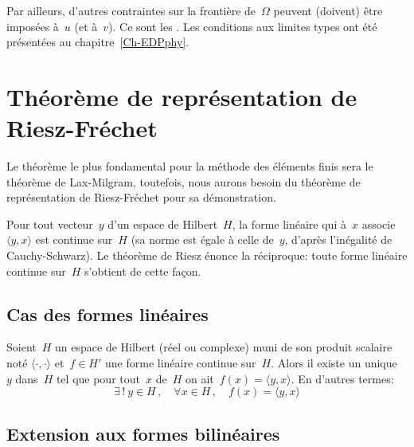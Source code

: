 \medskip
Par ailleurs, d'autres contraintes sur la frontière de~$\Omega$ peuvent (doivent) être imposées à~$u$ (et à~$v$). Ce sont les .
Les conditions aux limites types ont été présentées au chapitre~\ref{Ch-EDPphy}.

\medskip
\section{Théorème de représentation de Riesz-Fréchet}
Le théorème le plus fondamental pour la méthode des éléments finis sera le théorème de Lax-Milgram, toutefois, nous aurons besoin du théorème de représentation de Riesz-Fréchet pour sa démonstration. 

\medskip
Pour tout vecteur~$y$ d'un espace de Hilbert~$H$, la forme linéaire qui à~$x$ associe~$\langle y,x\rangle$ est continue sur~$H$ (sa norme est égale à celle de~$y$, d'après l'inégalité de Cauchy-Schwarz). Le théorème de Riesz énonce la réciproque: toute forme linéaire continue sur~$H$ s'obtient de cette façon.

\medskip
\subsection{Cas des formes linéaires}

\begin{theoreme}\label{Th-RF}
Soient~$H$ un espace de Hilbert (réel ou complexe) muni de son produit scalaire noté $\langle\cdot,\cdot\rangle$ et~$f \in H'$ une forme linéaire continue sur~$H$.
Alors il existe un unique~$y$ dans~$H$ tel que pour tout~$x$ de~$H$ on ait~$f(x)=\langle y,x\rangle$. En d'autres termes:
\begin{equation}
\exists\,!\ y \in H\,, \quad \forall x\in H\,, \quad f(x) = \langle y,x\rangle
\end{equation}
\end{theoreme}

\medskip
\subsection{Extension aux formes bilinéaires}

